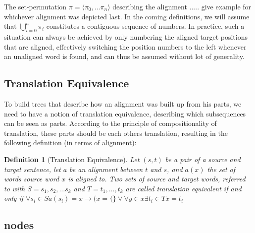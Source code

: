 \documentclass{report}
\theoremstyle{definition}
\theoremstyle{plain}
\newtheorem{definition}{Definition}
\begin{document}
The set-permutation $\pi=\langle \pi_0,\ldots\pi_n\rangle$ describing the alignment ..... give example for whichever alignment was depicted last. In the coming definitions, we will assume that $\bigcup_{i=0}^{n} \pi_i$ constitutes a contiguous sequence of numbers. In practice, such a situation can always be achieved by only numbering the aligned target positions that are aligned, effectively switching the position numbers to the left whenever an unaligned word is found, and can thus be assumed without lot of generality.


\subsection{Translation Equivalence}

To build trees that describe how an alignment was built up from his parts, we need to have a notion of translation equivalence, describing which subsequences can be seen as parts. According to the principle of compositionality of translation, these parts should be each others translation, resulting in the following definition (in terms of alignment):

\begin{definition}[Translation Equivalence]
Let $(s,t)$ be a pair of a source and target sentence, let $a$ be an alignment between $t$ and $s$, and $a(x)$ the set of words source word $x$ is aligned to. Two sets of source and target words, referred to with $S = s_1,s_2,\ldots s_k$ and $T = t_1,\ldots,t_k$ are called translation equivalent if and only if $\forall s_i\in S a(s_i)  = x \rightarrow (x = \{\} \lor \forall y \in x \exists t_i\in T x = t_i$
\end{definition}





\subsection{nodes}
\end{document}
